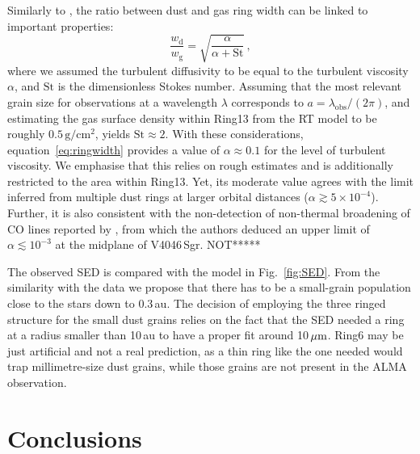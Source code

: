 \documentclass[letters,usenatbib,times]{mnras}
\begin{document}
Similarly to \citet{2018ApJ...869L..46D}, the ratio between dust and gas ring width can be linked to important properties:
\begin{equation}\label{eq:ringwidth}
        \frac{w_\mathrm{d}}{w_\mathrm{g}} = \sqrt{\frac{\alpha}{\alpha+\mathrm{St}}}\,,
\end{equation}
where we  assumed the turbulent diffusivity to be equal to the turbulent viscosity $\alpha$, and $\mathrm{St}$ is the dimensionless Stokes number. Assuming that the most relevant grain size for observations at a wavelength $\lambda$ corresponds to $a = \lambda_{\mathrm{obs}}/(2 \pi)$, and estimating the gas surface density within Ring13 from the RT model to be roughly $0.5\,\mathrm{g}/\mathrm{cm}^2$, yields $\mathrm{St}\approx 2$. With these considerations, equation~\ref{eq:ringwidth} provides a value of $\alpha \approx 0.1$ for the level of turbulent viscosity. We emphasise that this relies on rough estimates and is additionally restricted to the area within Ring13. Yet, its moderate value agrees with the limit \citet{2018ApJ...869L..46D} inferred from multiple dust rings at larger orbital distances ($\alpha \gtrsim 5\times10^{-4}$). Further, it is also consistent with the non-detection of non-thermal broadening of CO lines reported by \citet{Flaherty_2020}, from which the authors deduced an upper limit of $\alpha \lesssim 10^{-3}$ at the midplane of V4046\,Sgr.
NOT*****

The observed SED is compared with the model in Fig.~\ref{fig:SED}. From the similarity with the data we propose that there has to be a small-grain population close to the stars down to 0.3\,au. The decision of employing the three ringed structure for the small dust grains relies on the fact that the SED needed a ring at a radius smaller than 10\,au to have a proper fit around 10\,$\hbox{$\mu$m}$.
Ring6 may be just artificial and not a real prediction, as a thin ring like the one needed would trap millimetre-size dust grains, while  those grains are not present in the ALMA observation.

\section{Conclusions} \label{sec:Conclusions}
\end{document}
